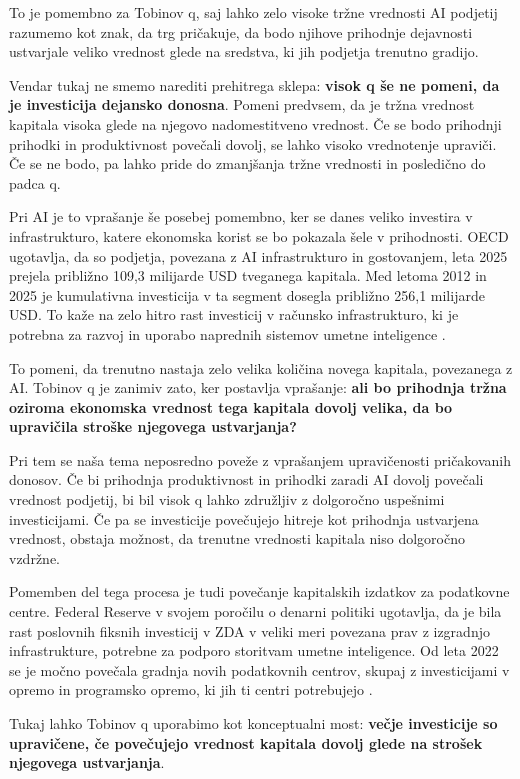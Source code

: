 \documentclass[12pt,a4paper]{article}
\begin{document}
To je pomembno za Tobinov q, saj lahko zelo visoke tržne vrednosti AI podjetij razumemo kot znak, da trg pričakuje, da bodo njihove prihodnje dejavnosti ustvarjale veliko vrednost glede na sredstva, ki jih podjetja trenutno gradijo.

Vendar tukaj ne smemo narediti prehitrega sklepa: \textbf{visok q še ne pomeni, da je investicija dejansko donosna}. Pomeni predvsem, da je tržna vrednost kapitala visoka glede na njegovo nadomestitveno vrednost. Če se bodo prihodnji prihodki in produktivnost povečali dovolj, se lahko visoko vrednotenje upraviči. Če se ne bodo, pa lahko pride do zmanjšanja tržne vrednosti in posledično do padca q.

Pri AI je to vprašanje še posebej pomembno, ker se danes veliko investira v infrastrukturo, katere ekonomska korist se bo pokazala šele v prihodnosti. OECD ugotavlja, da so podjetja, povezana z AI infrastrukturo in gostovanjem, leta 2025 prejela približno 109,3 milijarde USD tveganega kapitala. Med letoma 2012 in 2025 je kumulativna investicija v ta segment dosegla približno 256,1 milijarde USD. To kaže na zelo hitro rast investicij v računsko infrastrukturo, ki je potrebna za razvoj in uporabo naprednih sistemov umetne inteligence \citep{OECD2026}.

To pomeni, da trenutno nastaja zelo velika količina novega kapitala, povezanega z AI. Tobinov q je zanimiv zato, ker postavlja vprašanje: \textbf{ali bo prihodnja tržna oziroma ekonomska vrednost tega kapitala dovolj velika, da bo upravičila stroške njegovega ustvarjanja?}

Pri tem se naša tema neposredno poveže z vprašanjem upravičenosti pričakovanih donosov. Če bi prihodnja produktivnost in prihodki zaradi AI dovolj povečali vrednost podjetij, bi bil visok q lahko združljiv z dolgoročno uspešnimi investicijami. Če pa se investicije povečujejo hitreje kot prihodnja ustvarjena vrednost, obstaja možnost, da trenutne vrednosti kapitala niso dolgoročno vzdržne.

Pomemben del tega procesa je tudi povečanje kapitalskih izdatkov za podatkovne centre. Federal Reserve v svojem poročilu o denarni politiki ugotavlja, da je bila rast poslovnih fiksnih investicij v ZDA v veliki meri povezana prav z izgradnjo infrastrukture, potrebne za podporo storitvam umetne inteligence. Od leta 2022 se je močno povečala gradnja novih podatkovnih centrov, skupaj z investicijami v opremo in programsko opremo, ki jih ti centri potrebujejo \citep{FederalReserve2026}.

Tukaj lahko Tobinov q uporabimo kot konceptualni most: \textbf{večje investicije so upravičene, če povečujejo vrednost kapitala dovolj glede na strošek njegovega ustvarjanja}.
\end{document}

